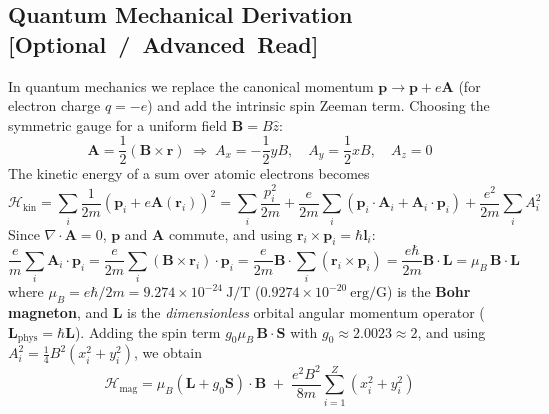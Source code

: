 \documentclass[11pt,a4paper]{article}
\newcommand{\extratag}{\hfill\mbox{\normalfont\footnotesize\sffamily\color{secondary}\textbf{[Optional / Advanced Read]}}}
\newcommand{\vb}[1]{\mathbf{#1}}
\begin{document}
\subsection[Quantum Mechanical Derivation (Optional Read)]{Quantum Mechanical Derivation \extratag}

In quantum mechanics we replace the canonical momentum $\vb{p}\to\vb{p}+e\vb{A}$ (for electron charge $q = -e$) and add the intrinsic spin Zeeman term. Choosing the symmetric gauge for a uniform field $\vb{B} = B\hat{z}$:
\begin{equation}
    \vb{A} = \frac{1}{2}(\vb{B}\times\vb{r})
    \;\Longrightarrow\;
    A_x = -\frac{1}{2}yB,\quad A_y = \frac{1}{2}xB,\quad A_z = 0
    \label{eq:symgauge}
\end{equation}
The kinetic energy of a sum over atomic electrons becomes
\begin{equation}
    \mathcal{H}_{\mathrm{kin}} = \sum_i\frac{1}{2m}\left(\vb{p}_i + e\vb{A}(\vb{r}_i)\right)^2
    = \sum_i\frac{p_i^2}{2m}
    + \frac{e}{2m}\sum_i\left(\vb{p}_i\cdot\vb{A}_i + \vb{A}_i\cdot\vb{p}_i\right)
    + \frac{e^2}{2m}\sum_i A_i^2
    \label{eq:kinetic}
\end{equation}
Since $\nabla\cdot\vb{A} = 0$, $\vb{p}$ and $\vb{A}$ commute, and using $\vb{r}_i\times\vb{p}_i = \hbar\vb{l}_i$:
\begin{equation}
    \frac{e}{m}\sum_i\vb{A}_i\cdot\vb{p}_i
    = \frac{e}{2m}\sum_i(\vb{B}\times\vb{r}_i)\cdot\vb{p}_i
    = \frac{e}{2m}\vb{B}\cdot\sum_i(\vb{r}_i\times\vb{p}_i)
    = \frac{e\hbar}{2m}\vb{B}\cdot\vb{L}
    = \mu_B\,\vb{B}\cdot\vb{L}
    \label{eq:zeemanorb}
\end{equation}
where $\mu_B = e\hbar/2m = 9.274\times10^{-24}\ \mathrm{J/T}$ ($0.9274\times10^{-20}\ \mathrm{erg/G}$) is the \textbf{Bohr magneton}, and $\vb{L}$ is the \emph{dimensionless} orbital angular momentum operator ($\vb{L}_{\mathrm{phys}} = \hbar\vb{L}$). Adding the spin term $g_0\mu_B\,\vb{B}\cdot\vb{S}$ with $g_0\approx 2.0023\approx 2$, and using $A_i^2 = \frac{1}{4}B^2(x_i^2+y_i^2)$, we obtain
\begin{equation}
    \boxed{\;\mathcal{H}_{\mathrm{mag}} = \mu_B\left(\vb{L} + g_0\vb{S}\right)\cdot\vb{B}
    \;+\; \frac{e^2B^2}{8m}\sum_{i=1}^{Z}\left(x_i^2+y_i^2\right)\;}
    \label{eq:hmag}
\end{equation}
\end{document}
